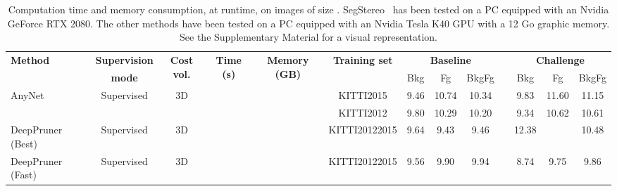 \documentclass[10pt,journal,compsoc]{IEEEtran}
\begin{document}
\begin{table*}[t]
\caption{\label{tab:memory_time}  Computation time and memory consumption, at runtime, on images of size .  SegStereo~\cite{yang2018segstereo} has been tested on a PC equipped with  an Nvidia  GeForce RTX 2080. The other methods have been tested on a PC equipped with  an Nvidia Tesla K40 GPU with a 12 Go graphic memory.  See the Supplementary Material for a visual representation. }

\resizebox{\linewidth}{!}
	{

\begin{tabular}{@{}l c @{ }ccc@{}c@{ }c ccc@{}ccc@{}}  
	\toprule
	\multirow{2}{*}{\textbf{Method}} &  {\textbf{Supervision}} &\multirow{2}{*}{\textbf{Cost vol.}} & \multirow{2}{*}{\textbf{Time (s)}} &  \multirow{2}{*}{\textbf{Memory (GB)}}  & \multirow{2}{*}{\textbf{Training set}} & \multicolumn{3}{c}{\textbf{Baseline}} &   & \multicolumn{3}{c}{\textbf{Challenge}}  \\ \cline{7-9} \cline{11-13}
		& \textbf{mode} & & & & & Bkg & Fg &  BkgFg & &  Bkg & Fg &  BkgFg\\
	\midrule
	AnyNet~\cite{wang2019anytime} &   Supervised & 3D &   &	  & KITTI2015 &   9.46	& 10.74	&10.34	 && 9.83	& 11.60 & 11.15\\
	\cline{6-13}
							   &     & &   &	   & KITTI2012 &  9.80	&10.29	&10.20	& &9.34	&10.62	&10.61\\
	\cline{1-13}
	DeepPruner (Best)~\cite{Duggal_2019_ICCV}  & Supervised & 3D &   &  &  KITTI20122015 & 9.64&	9.43	& 9.46& & 	12.38	&  &10.48 \\
	\cline{1-13}
	DeepPruner (Fast)~\cite{Duggal_2019_ICCV}   &Supervised &  3D &   &  &  KITTI20122015  &9.56&	9.90	&9.94	& &8.74&	9.75	&9.86 \\
	\cline{1-13}
	

\end{tabular}}
\end{table*}
\end{document}
